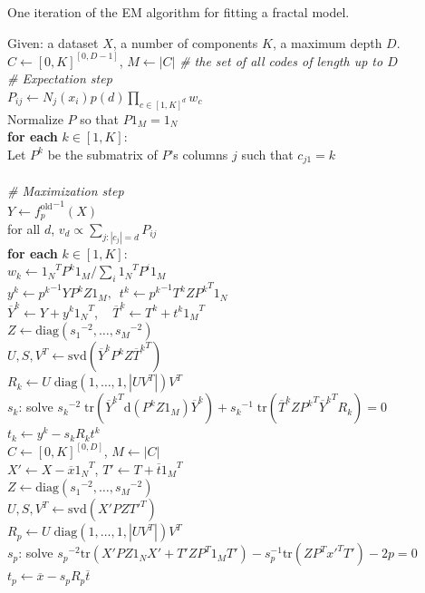 \documentclass[10pt,a4paper,oneside]{article}
\theoremstyle{definition}
\newcommand{\tab}{\hspace*{5mm}}
\newcommand{\ol}[1]{\overline{#1}}
\theoremstyle{definition}
\begin{document}
\begin{pseudo}[th]
\caption{One iteration of the EM algorithm for fitting a fractal model.}
{
Given: a dataset $X$, a number of components $K$, a maximum depth $D$. \\

$C \leftarrow [0,K]^{[0, D-1]}$, $M \leftarrow |C|$ \emph{\# the set of all codes of length up to $D$} \\
\emph{\# Expectation step}\\
$P_{ij} \leftarrow N_j(x_i) p(d) \prod_{c \in [1,K]^d} w_c$  \\ 
Normalize $P$ so that $P1_M = 1_N$ \\
\textbf{for each} $k \in [1,K]$: \\
\tab Let $P^k$ be the submatrix of $P$'s columns $j$ such that $c_{j1} = k$\\
\\
\emph{\# Maximization step} \\
$Y \leftarrow {f^\text{old}_p}^{-1}(X)$\\
for all $d$, $v_d \propto \sum_{j : |c_j| = d} P_{ij} $\\
\textbf{for each} $k \in [1,K]$: \\
\tab $w_k \leftarrow {1_N}^T P^k 1_M / \sum_i {{1_N}^T P^i 1_M}$\\
\tab $y^k \leftarrow {p^k}^{-1}YP^kZ1_M, \,\,\, t^k \leftarrow {p^k}^{-1} T^kZ{P^k}^T 1_N$\\
\tab $\ol{Y}^k \leftarrow Y + y^k{1_N}^T$, \,\,\, $\ol{T}^k \leftarrow T^k + t^k{1_M}^T$\\
\tab $Z \leftarrow \text{diag}({s_1}^{-2}, \ldots, {s_M}^{-2})$\\
\tab $U,S,V^T \leftarrow \text{svd}(\ol{Y}^kP^kZ{\ol{T}^k}^T)$\\ 
\tab $R_k \leftarrow U\;\text{diag}(1,\ldots,1,|UV^T|) V^T$ \\
\tab $s_k$: solve ${s_k}^{-2}\; \text{tr}({\ol{Y}^k}^T\text{d}(P^kZ1_M)\ol{Y}^k) + {s_k}^{-1}\;\text{tr}(\ol{T}^kZ{P^k}^T{\ol{Y}^k}^TR_k) = 0$ \\
\tab $t_k \leftarrow y^k - s_k R_k t^k$ \\

$C \leftarrow [0,K]^{[0, D]}$, $M \leftarrow |C|$\\
$X' \leftarrow X - \overline{x}{1_N}^T$, $T' \leftarrow T + \overline{t}{1_M}^T$\\
\tab $Z \leftarrow \text{diag}({s_1}^{-2}, \ldots, {s_M}^{-2})$\\
$U,S,V^T \leftarrow \text{svd}(X'PZ{T'}^T)$\\ 
$R_p \leftarrow U\;\text{diag}(1,\ldots,1,|UV^T|) V^T$ \\
$s_p$: solve ${s_p}^{-2}\text{tr}(X'PZ1_NX'+ T'Z{P}^T1_MT') - s_p^{-1} \text{tr}(ZP^T{x'}^TT') -2p = 0$ \\
$t_p \leftarrow \overline{x} - s_pR_p\overline{t}$ \\
}
\end{pseudo}
\end{document}
